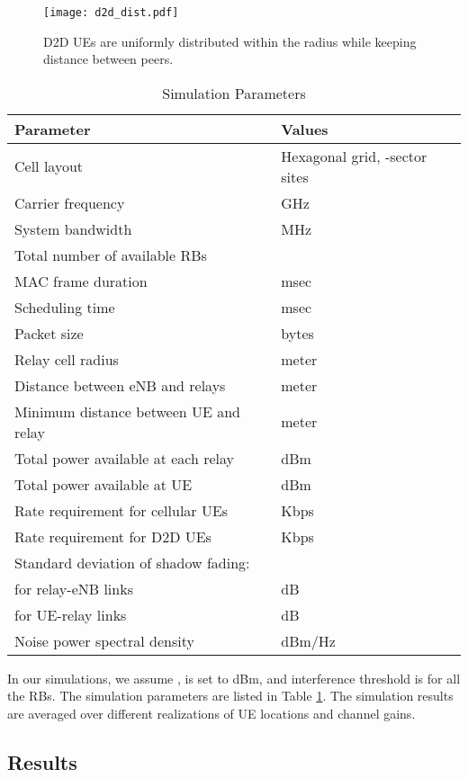 \documentclass[twocolumn,10pt]{IEEEtran}
\begin{document}
\begin{figure}[!h t b]
\centering
\texttt{[image: d2d\_dist.pdf]}
\caption{D2D UEs are uniformly distributed within the radius  while keeping distance  between peers.} 
\label{fig:d2d_position}
\end{figure}


\begin{table}[!t]
\renewcommand{\arraystretch}{1.3}
\caption{Simulation Parameters}
\label{tab:sim_param}
\centering
\begin{tabular}{l|l}
\hline
\bfseries Parameter & \bfseries Values\\
\hline\hline
Cell layout & Hexagonal grid, -sector sites \\
Carrier frequency &  GHz \\
System bandwidth &  MHz \\
Total number of available RBs &  \\
MAC frame duration &  msec \\
Scheduling time &  msec \\
Packet size &  bytes \\
Relay cell radius &  meter\\
Distance between eNB and relays &  meter\\
Minimum distance between UE and relay &  meter\\
Total power available at each relay &  dBm \\
Total power available at UE &  dBm \\
Rate requirement for cellular UEs &  Kbps \\
Rate requirement for D2D UEs &  Kbps \\
Standard deviation of shadow fading: \\
 \hspace{5em} for relay-eNB links &  dB \\
 \hspace{5em} for UE-relay links &  dB \\
Noise power spectral density &  dBm/Hz \\
\hline
\end{tabular}
\end{table}

In our simulations, we assume ,  is set to  dBm, and interference threshold is  for all the RBs. The simulation parameters  are listed in Table \ref{tab:sim_param}. The simulation results are averaged over different realizations of  UE locations and channel gains.

\subsection{Results} \label{sec:numerical_results}
\end{document}
